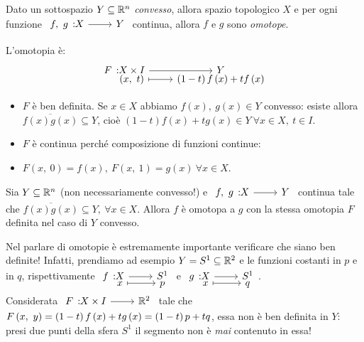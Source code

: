 \begin{example}\label{convessoomotope}
	Dato un sottospazio $Y\subseteq \mathbb{R}^n$ \textit{convesso}, allora spazio topologico $X$ e per ogni funzione $\funz{f,\ g}{X}{Y}$ continua, allora $f$ e $g$ sono \textit{omotope}.
\end{example}
\begin{demonstration}
	L'omotopia è:
	\begin{equation*}
		\funztot{F}{X\times I}{Y}{\left(x,\ t\right)}{\left(1-t\right)f\left(x\right)+tf\left(x\right)}
	\end{equation*}
\begin{itemize}
	\item $F$ è ben definita. Se $x\in X$ abbiamo $f\left(x\right),\ g\left(x\right)\in Y$ convesso: esiste allora $\overline{f\left(x\right)g\left(x\right)}\subseteq Y$, cioè $\left(1-t\right)f\left(x\right)+tg\left(x\right)\in Y\ \forall x\in X,\ t\in I$.
	\item $F$ è continua perché composizione di funzioni continue:
	\begin{center}
	\end{center}
\item $F\left(x,\ 0\right)=f\left(x\right),\ F\left(x,\ 1\right)=g\left(x\right)\ \forall x\in X$.
\end{itemize}
\vspace{-3mm}
\end{demonstration}
\begin{observe}\label{omotopiasegmento}
	Sia $Y\subseteq \mathbb{R}^n$ (non necessariamente convesso!) e $\funz{f,\ g}{X}{Y}$ continua tale che $\overline{f\left(x\right)g\left(x\right)}\subseteq Y,\ \forall x\in X$. Allora $f$ è omotopa a $g$ con la stessa omotopia $F$ definita nel caso di $Y$ convesso.
\end{observe}
\begin{attention}
Nel parlare di omotopie è estremamente importante verificare che siano ben definite! Infatti, prendiamo ad esempio $Y=S^1\subseteq \mathbb{R}^2$ e le funzioni costanti in $p$ e in $q$, rispettivamente $\funztot{f}{X}{S^1}{x}{p}$ e $\funztot{g}{X}{S^1}{x}{q}$.\\
Considerata $\funz{F}{X\times I}{\realset^2}$ tale che $F\left(x,\ y\right)=\left(1-t\right)f\left(x\right)+tg\left(x\right)=\left(1-t\right)p+tq$, essa non è ben definita in $Y$: presi due punti della sfera $S^1$ il segmento non è \textit{mai} contenuto in essa!
\end{attention}
